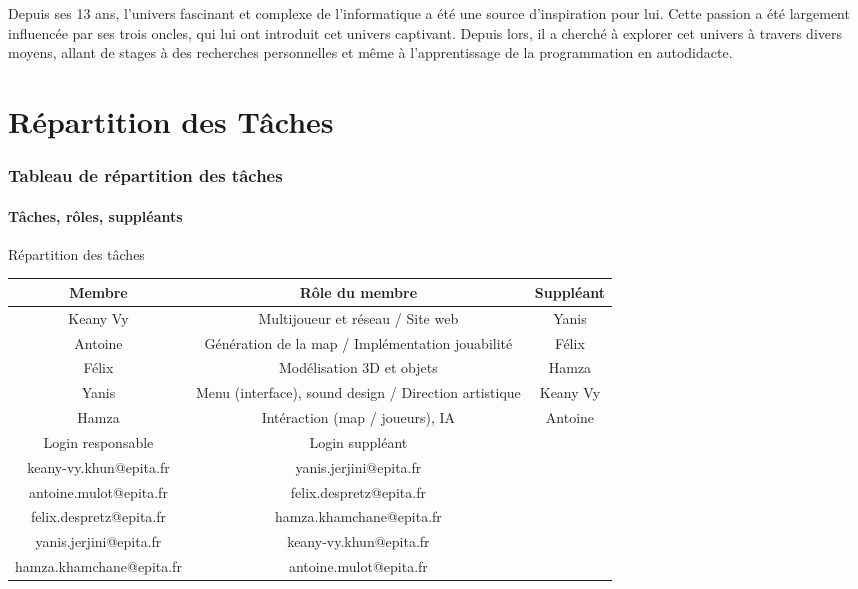 \documentclass[
	article,			%
	11pt,				%
	oneside,			%
	a4paper,			%
	chapter=TITLE,
	french,			%
	sumario=tradicional
	]{base_nt}
\begin{document}
Depuis ses 13 ans, l'univers fascinant et complexe de l'informatique a été une source d'inspiration pour lui. Cette passion a été largement influencée par ses trois oncles, qui lui ont introduit cet univers captivant. Depuis lors, il a cherché à explorer cet univers à travers divers moyens, allant de stages à des recherches personnelles et même à l'apprentissage de la programmation en autodidacte.

\part{Répartition des Tâches}

\section{Tableau de répartition des tâches}

\subsection{Tâches, rôles, suppléants}

\begin{quadro}
	\caption{Répartition des tâches}
	\centering
	\begin{tabular}{|c|c|c|}
		\hline
		Membre   & Rôle du membre & Suppléant  \\
		\hline
		Keany Vy & Multijoueur et réseau / Site web & Yanis \\
		Antoine & Génération de la map / Implémentation jouabilité & Félix \\
		Félix & Modélisation 3D et objets & Hamza \\
            Yanis & Menu (interface), sound design / Direction artistique  & Keany Vy \\
            Hamza & Intéraction (map / joueurs), IA  & Antoine \\
		\hline
		Login responsable &  Login suppléant  & \\
            \hline
            keany-vy.khun@epita.fr & yanis.jerjini@epita.fr & \\
            antoine.mulot@epita.fr & felix.despretz@epita.fr & \\
            felix.despretz@epita.fr & hamza.khamchane@epita.fr & \\
            yanis.jerjini@epita.fr & keany-vy.khun@epita.fr & \\
            hamza.khamchane@epita.fr & antoine.mulot@epita.fr & \\
            \hline
	\end{tabular}
\end{quadro}
\end{document}
